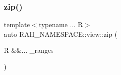 \mbox{\label{namespace_r_a_h___n_a_m_e_s_p_a_c_e_1_1view_ad2ae22a5f8e0df5b5abea7da154f6b33}} 
\subsubsection{\texorpdfstring{zip()}{zip()}}
{\footnotesize\ttfamily template$<$typename ... R$>$ \\
auto R\+A\+H\+\_\+\+N\+A\+M\+E\+S\+P\+A\+C\+E\+::view\+::zip (\begin{DoxyParamCaption}\item[{R \&\&...}]{\+\_\+ranges }\end{DoxyParamCaption})}


